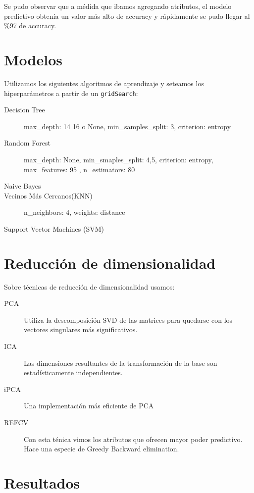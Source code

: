\documentclass[10pt, a4paper]{article}
\begin{document}
Se pudo observar que a médida que ibamos agregando atributos, el modelo predictivo obtenía un valor más alto de accuracy y rápidamente se pudo llegar al \%97 de accuracy.

\section{Modelos}
Utilizamos los siguientes algoritmos de aprendizaje y seteamos los hiperparámetros a partir de un \texttt{gridSearch}:

\begin{description}
\item [Decision Tree] max\_depth: 14 16 o None, min\_samples\_split: 3, criterion: entropy
\item [Random Forest] max\_depth: None, min\_smaples\_split: 4,5, criterion: entropy, max\_features: 95 , n\_estimators: 80
\item [Naive Bayes]
\item [Vecinos Más Cercanos(KNN)]  n\_neighbors: 4, weights: distance
\item [Support Vector Machines (SVM)]
\end{description}


\section{Reducción de dimensionalidad}
Sobre técnicas de reducción de dimensionalidad usamos:

\begin{description}
\item [PCA] Utiliza la descomposición SVD de las matrices para quedarse con los vectores singulares más significativos.
\item [ICA] Las dimensiones resultantes de la transformación de la base son estadísticamente independientes.
\item [iPCA] Una implementación más eficiente de PCA
\item [REFCV] Con esta ténica vimos los atributos que ofrecen mayor poder predictivo. Hace una especie de Greedy Backward elimination.
\end{description}

\section{Resultados}
\end{document}
